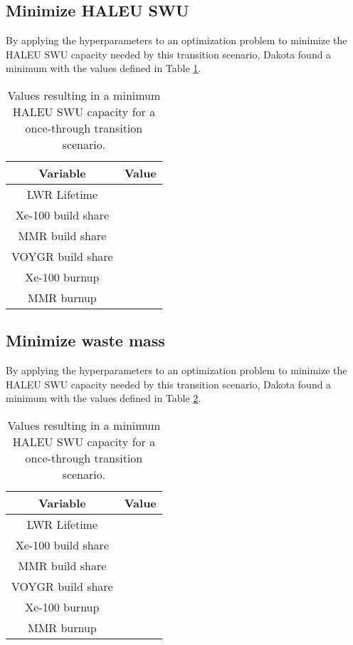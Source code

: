 \subsection{Minimize HALEU SWU}
By applying the hyperparameters to an optimization problem to minimize the 
\gls{HALEU} \gls{SWU} capacity needed by this transition scenario, Dakota
found a minimum with the values defined in Table \ref{tab:soga_ot_haleu}.

\begin{table}
    \centering 
    \caption{Values resulting in a minimum \gls{HALEU} \gls{SWU} capacity for 
              a once-through transition scenario.}
    \label{tab:soga_ot_haleu}
    \begin{tabular}{c c}
        \hline
        Variable & Value \\
        \hline
        LWR Lifetime & \\
        Xe-100 build share & \\
        MMR build share & \\
        VOYGR build share & \\
        Xe-100 burnup & \\
        MMR burnup & \\
        \hline
    \end{tabular}
\end{table}

\subsection{Minimize waste mass}
By applying the hyperparameters to an optimization problem to minimize the 
\gls{HALEU} \gls{SWU} capacity needed by this transition scenario, Dakota
found a minimum with the values defined in Table \ref{tab:soga_ot_waste}.

\begin{table}
    \centering 
    \caption{Values resulting in a minimum \gls{HALEU} \gls{SWU} capacity for 
              a once-through transition scenario.}
    \label{tab:soga_ot_waste}
    \begin{tabular}{c c}
        \hline
        Variable & Value \\
        \hline
        LWR Lifetime & \\
        Xe-100 build share & \\
        MMR build share & \\
        VOYGR build share & \\
        Xe-100 burnup & \\
        MMR burnup & \\
        \hline
    \end{tabular}
\end{table}

